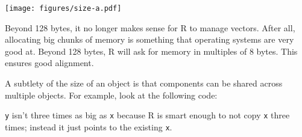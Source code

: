 \begin{Shaded}
\begin{Highlighting}[]
\NormalTok{(}\NormalTok{:}\StringTok{ }\NormalTok{, } \NormalTok{, }
   \NormalTok{, } \NormalTok{)}
\NormalTok{(} \NormalTok{, } \NormalTok{)}
\NormalTok{(} \NormalTok{(}\NormalTok{, }\NormalTok{, }\NormalTok{, }\NormalTok{, }\NormalTok{, }\NormalTok{), } \NormalTok{)}
\NormalTok{(} \NormalTok{, } \NormalTok{, } \NormalTok{, } \NormalTok{)}
\StringTok{ }\NormalTok{, } \NormalTok{)}
\end{Highlighting}
\end{Shaded}

\texttt{[image: figures/size-a.pdf]}

Beyond 128 bytes, it no longer makes sense for R to manage vectors.
After all, allocating big chunks of memory is something that operating
systems are very good at. Beyond 128 bytes, R will ask for memory in
multiples of 8 bytes. This ensures good alignment.

A subtlety of the size of an object is that components can be shared
across multiple objects. For example, look at the following code:

\begin{Shaded}
\begin{Highlighting}[]
\StringTok{ }\NormalTok{:}

\StringTok{ }
\end{Highlighting}
\end{Shaded}

\texttt{y} isn't three times as big as \texttt{x} because R is smart
enough to not copy \texttt{x} three times; instead it just points to the
existing \texttt{x}.

